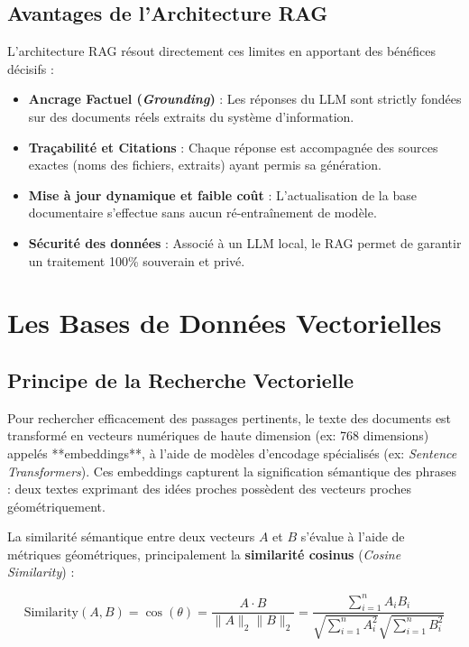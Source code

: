 \subsection{Avantages de l'Architecture RAG}
L'architecture RAG résout directement ces limites en apportant des bénéfices décisifs :
\begin{itemize}
    \item \textbf{Ancrage Factuel (\textit{Grounding})} : Les réponses du LLM sont strictly fondées sur des documents réels extraits du système d'information.
    \item \textbf{Traçabilité et Citations} : Chaque réponse est accompagnée des sources exactes (noms des fichiers, extraits) ayant permis sa génération.
    \item \textbf{Mise à jour dynamique et faible coût} : L'actualisation de la base documentaire s'effectue sans aucun ré-entraînement de modèle.
    \item \textbf{Sécurité des données} : Associé à un LLM local, le RAG permet de garantir un traitement 100\% souverain et privé.
\end{itemize}

\section{Les Bases de Données Vectorielles}

\subsection{Principe de la Recherche Vectorielle}
Pour rechercher efficacement des passages pertinents, le texte des documents est transformé en vecteurs numériques de haute dimension (ex: 768 dimensions) appelés **embeddings**, à l'aide de modèles d'encodage spécialisés (ex: \textit{Sentence Transformers}). Ces embeddings capturent la signification sémantique des phrases : deux textes exprimant des idées proches possèdent des vecteurs proches géométriquement.

La similarité sémantique entre deux vecteurs $A$ et $B$ s'évalue à l'aide de métriques géométriques, principalement la \textbf{similarité cosinus} (\textit{Cosine Similarity}) :

\begin{equation}
\label{eq:cosine}
\text{Similarity}(A, B) = \cos(\theta) = \frac{A \cdot B}{\|A\|_2 \|B\|_2} = \frac{\sum_{i=1}^{n} A_i B_i}{\sqrt{\sum_{i=1}^{n} A_i^2} \sqrt{\sum_{i=1}^{n} B_i^2}}
\end{equation}

